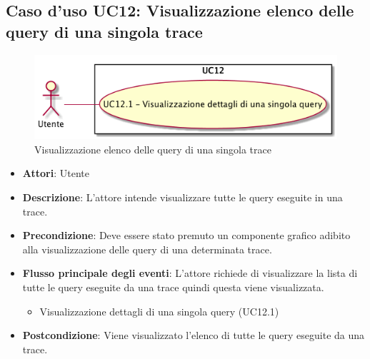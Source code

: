 \subsection{Caso d'uso UC12: Visualizzazione elenco delle query di una singola trace}
\begin{figure} [H]
	\centering
	\includegraphics[scale=0.45]{./UC/UC12.png}
	\caption{Visualizzazione elenco delle query di una singola trace}\label{}
\end{figure}
\begin{itemize}
	\item \textbf{Attori}: Utente
	\item \textbf{Descrizione}: L'attore intende visualizzare tutte le query eseguite in una trace.
	\item \textbf{Precondizione}: Deve essere stato premuto un componente grafico adibito alla visualizzazione delle query di una determinata trace.
	\item \textbf{Flusso principale degli eventi}: L'attore richiede di visualizzare la lista di tutte le query eseguite da una trace quindi questa viene visualizzata.
	\begin{itemize}
		\item Visualizzazione dettagli di una singola query (UC12.1)
	\end{itemize}
	\item \textbf{Postcondizione}: Viene visualizzato l'elenco di tutte le query eseguite da una trace.
\end{itemize}
